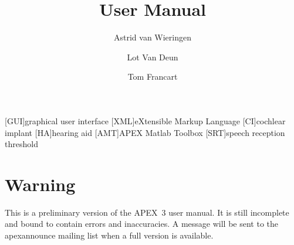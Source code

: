 \documentclass[a4paper,12pt]{book}
\title{\apex User Manual}
\author{Astrid van Wieringen \and Lot Van Deun \and Tom Francart}
\newcommand{\incomplete}[1]{#1}
\newcommand{\apex}{APEX~3\xspace}
\begin{document}
\begin{acronym}
[GUI]{graphical user interface}
[XML]{eXtensible Markup Language}
[CI]{cochlear implant}
[HA]{hearing aid}
[AMT]{APEX Matlab Toolbox}
[SRT]{speech reception threshold}
\end{acronym}



\maketitle


\section*{Warning}

This is a preliminary version of the \apex user manual. It is still incomplete and bound to contain errors and inaccuracies. A message will be sent to the apexannounce mailing list when a full version is available.


\newpage


\tableofcontents







\incomplete{}



\appendix

\incomplete{}          %
\incomplete{}
\incomplete{}
\incomplete{}




\printindex
\end{document}

